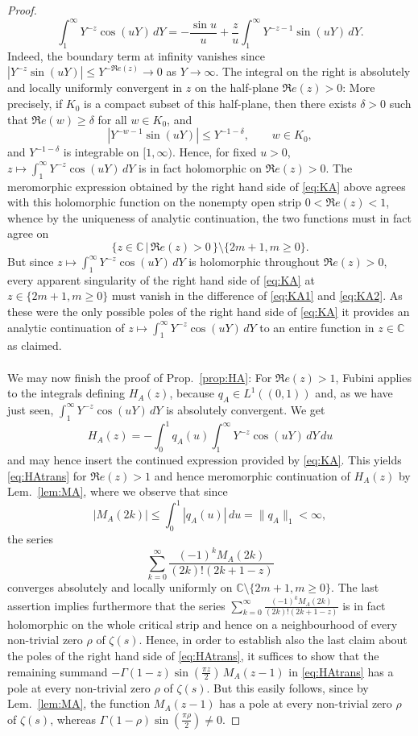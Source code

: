 \documentclass[a4paper,10pt]{amsart}
\newcommand{\C}{\mathbb C}
\theoremstyle{definition}
\numberwithin{equation}{section}
\def\C{\mathbb C}
\begin{document}
\begin{proof}
$$\int_1^\infty Y^{-z}\cos(uY)\,dY=-\frac{\sin u}{u}+\frac{z}{u} \int_1^\infty Y^{-z-1}\sin(uY)\,dY.$$
Indeed, the boundary term at infinity vanishes since $|Y^{-z}\sin(uY)|\le Y^{-\Re e(z)}\longrightarrow 0$ as $Y\to\infty$. The integral on the right is absolutely and locally uniformly convergent in $z$ on the half-plane $\Re e(z)>0$:  More precisely, if $K_0$ is a compact subset of this half-plane, then there exists $\delta>0$ such that $\Re e(w)\ge\delta$ for all $w\in K_0$, and
$$|Y^{-w-1}\sin(uY)| \le Y^{-1-\delta}, \qquad w\in K_0,
$$
and $Y^{-1-\delta}$ is integrable on $[1,\infty)$.  Hence, for fixed $u>0$, $z\mapsto \int_1^\infty Y^{-z}\cos(uY)\,dY$ is in fact holomorphic on $\Re e(z)>0$. The meromorphic expression obtained by the right hand side of \eqref{eq:KA} above agrees with this holomorphic function on the nonempty open strip $0<\Re e(z)<1$, whence by the uniqueness of analytic continuation, the two functions must in fact agree on
$$
\{z\in\C\,| \,\Re e(z)>0\,\}\setminus\{2m+1, m\geq 0\}.
$$
But since $z\mapsto \int_1^\infty Y^{-z}\cos(uY)\,dY$ is holomorphic throughout $\Re e(z)>0$, every apparent singularity of the right hand side of \eqref{eq:KA} at
$z\in \{2m+1, m\geq 0\}$ must vanish in the difference of \eqref{eq:KA1} and \eqref{eq:KA2}. As these were the only possible poles of the right hand side of \eqref{eq:KA} it provides an analytic continuation of $z\mapsto \int_1^\infty Y^{-z}\cos(uY)\,dY$ to an entire function in $z\in\C$ as claimed.\\\\
We may now finish the proof of Prop.\ \ref{prop:HA}: For $\Re e(z)>1$, Fubini applies to the integrals defining $H_A(z)$, because $q_A\in L^1((0,1))$ and, as we have just seen, $\int_1^\infty Y^{-z}\cos(uY)\,dY$ is absolutely convergent. We get
$$
H_A(z)=-\int_0^1q_A(u)\int_1^\infty Y^{-z}\cos(uY)\,dY\,du
$$
and may hence insert the continued expression provided by \eqref{eq:KA}. This yields \eqref{eq:HAtrans} for $\Re e(z)>1$ and hence meromorphic continuation of $H_A(z)$ by Lem.\ \ref{lem:MA}, where we observe that since
$$|M_A(2k)| \leq \int_0^1 |q_A(u)|\,du =\|q_A\|_1<\infty,$$
the series 
$$\sum_{k=0}^{\infty}\frac{(-1)^k M_A(2k)}{(2k)!(2k+1-z)}$$
converges absolutely and locally uniformly on $\mathbb C\setminus\{2m+1, m\geq 0\}$. The last assertion implies furthermore that the series $\sum_{k=0}^{\infty}\frac{(-1)^k M_A(2k)}{(2k)!(2k+1-z)}$ is in fact holomorphic on the whole critical strip and hence on a neighbourhood of every non-trivial zero $\rho$ of $\zeta(s)$. Hence, in order to establish also the last claim about the poles of the right hand side of \eqref{eq:HAtrans}, it suffices to show that the remaining summand $-\Gamma(1-z)\sin\left(\frac{\pi z}{2}\right)\,M_A(z-1)$ in \eqref{eq:HAtrans} has a pole at every non-trivial zero $\rho$ of $\zeta(s)$. But this easily follows, since by Lem.\ \ref{lem:MA}, the function $M_A(z-1)$ has a pole at every non-trivial zero $\rho$ of $\zeta(s)$, whereas $\Gamma(1-\rho)\sin\left(\frac{\pi \rho}{2}\right)\neq 0$.
\end{proof}
\end{document}

